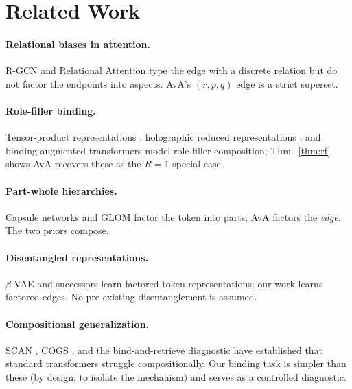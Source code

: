 \documentclass{article}
\begin{document}
\section{Related Work}

\paragraph{Relational biases in attention.} R-GCN
\citep{schlichtkrull2018modeling} and Relational Attention
\citep{diao2023relational} type the edge with a discrete relation but
do not factor the endpoints into aspects. AvA's $(r, p, q)$ edge is a
strict superset.

\paragraph{Role-filler binding.} Tensor-product representations
\citep{smolensky1990tensor}, holographic reduced representations
\citep{plate1995holographic}, and binding-augmented transformers
\citep{schlag2019enhancing, schlag2021linear} model role-filler
composition; Thm.~\ref{thm:rf} shows AvA recovers these as the $R{=}1$
special case.

\paragraph{Part-whole hierarchies.} Capsule networks
\citep{sabour2017dynamic} and GLOM \citep{hinton2021glom} factor the
token into parts; AvA factors the \emph{edge}. The two priors
compose.

\paragraph{Disentangled representations.} $\beta$-VAE
\citep{higgins2017beta} and successors learn factored token
representations; our work learns factored edges. No pre-existing
disentanglement is assumed.

\paragraph{Compositional generalization.} SCAN \citep{lake2018scan},
COGS \citep{kim2020cogs}, and the bind-and-retrieve diagnostic
\citep{webb2020emergent, russin2019compositional} have established that
standard transformers struggle compositionally. Our binding task is
simpler than these (by design, to isolate the mechanism) and serves as
a controlled diagnostic.
\end{document}
